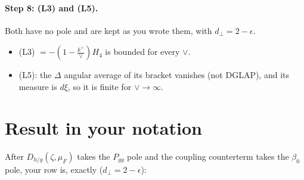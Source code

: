 \documentclass[10pt]{article}
\numberwithin{equation}{section}
\begin{document}
\paragraph{Step 8: (L3) and (L5).} Both have no pole and are kept as you wrote them, with $d_\perp=2-\epsilon$.
\begin{itemize}
\item (L3) $=-(1-\frac{k^+}{\vee})H_4$ is bounded for every $\vee$.
\item (L5): the $\Delta$ angular average of its bracket vanishes (not DGLAP), and its measure is $d\xi$, so it is finite for $\vee\to\infty$.
\end{itemize}

\section{Result in your notation}
After $D_{h/g}(\zeta,\mu_F)$ takes the $P_{gg}$ pole and the coupling counterterm takes the $\beta_0$ pole, your row is, exactly ($d_\perp=2-\epsilon$):
\end{document}
